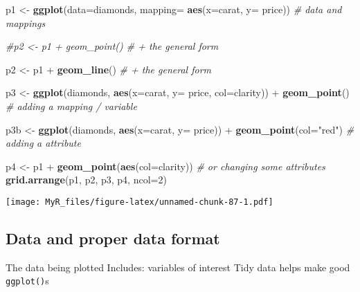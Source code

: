 \documentclass[]{book}
\newenvironment{Shaded}{}{}
\newcommand{\CommentTok}[1]{\textcolor[rgb]{0.38,0.63,0.69}{\textit{#1}}}
\newcommand{\DataTypeTok}[1]{\textcolor[rgb]{0.56,0.13,0.00}{#1}}
\newcommand{\DecValTok}[1]{\textcolor[rgb]{0.25,0.63,0.44}{#1}}
\newcommand{\KeywordTok}[1]{\textcolor[rgb]{0.00,0.44,0.13}{\textbf{#1}}}
\newcommand{\NormalTok}[1]{#1}
\newcommand{\OperatorTok}[1]{\textcolor[rgb]{0.40,0.40,0.40}{#1}}
\newcommand{\StringTok}[1]{\textcolor[rgb]{0.25,0.44,0.63}{#1}}
\theoremstyle{definition}
\theoremstyle{definition}
\theoremstyle{definition}
\theoremstyle{remark}
\begin{document}
\begin{Shaded}
\begin{Highlighting}[]

\NormalTok{p1 <-}\StringTok{ }\KeywordTok{ggplot}\NormalTok{(}\DataTypeTok{data=}\NormalTok{diamonds, }\DataTypeTok{mapping=} \KeywordTok{aes}\NormalTok{(}\DataTypeTok{x=}\NormalTok{carat, }\DataTypeTok{y=}\NormalTok{ price)) }\CommentTok{# data and mappings}

\CommentTok{#p2 <- p1 + geom_point()  # + the general form}

\NormalTok{p2 <-}\StringTok{ }\NormalTok{p1 }\OperatorTok{+}\StringTok{ }\KeywordTok{geom_line}\NormalTok{()  }\CommentTok{# + the general form}

\NormalTok{p3 <-}\StringTok{ }\KeywordTok{ggplot}\NormalTok{(diamonds, }\KeywordTok{aes}\NormalTok{(}\DataTypeTok{x=}\NormalTok{carat, }\DataTypeTok{y=}\NormalTok{ price, }\DataTypeTok{col=}\NormalTok{clarity)) }\OperatorTok{+}
\StringTok{      }\KeywordTok{geom_point}\NormalTok{() }\CommentTok{# adding a mapping / variable}

\NormalTok{p3b <-}\StringTok{ }\KeywordTok{ggplot}\NormalTok{(diamonds, }\KeywordTok{aes}\NormalTok{(}\DataTypeTok{x=}\NormalTok{carat, }\DataTypeTok{y=}\NormalTok{ price)) }\OperatorTok{+}
\StringTok{      }\KeywordTok{geom_point}\NormalTok{(}\DataTypeTok{col=}\StringTok{"red"}\NormalTok{) }\CommentTok{# adding a attribute}


\NormalTok{p4 <-}\StringTok{ }\NormalTok{p1 }\OperatorTok{+}\StringTok{ }\KeywordTok{geom_point}\NormalTok{(}\KeywordTok{aes}\NormalTok{(}\DataTypeTok{col=}\NormalTok{clarity)) }\CommentTok{# or changing some attributes}
\KeywordTok{grid.arrange}\NormalTok{(p1, p2, p3, p4, }\DataTypeTok{ncol=}\DecValTok{2}\NormalTok{)}
\end{Highlighting}
\end{Shaded}

\texttt{[image: MyR\_files/figure-latex/unnamed-chunk-87-1.pdf]}

\hypertarget{data-and-proper-data-format}{%
\subsection{Data and proper data
format}\label{data-and-proper-data-format}}

The data being plotted Includes: variables of interest Tidy data helps
make good \texttt{ggplot()}s
\end{document}

